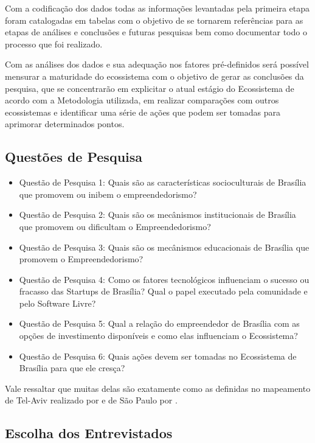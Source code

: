Com a codificação dos dados todas as informações levantadas pela primeira etapa foram catalogadas em tabelas com o objetivo de se tornarem referências para as etapas de análises e conclusões e futuras pesquisas bem como documentar todo o processo que foi realizado. 

Com as análises dos dados e sua adequação nos fatores pré-definidos será possível mensurar a maturidade do ecossistema com o objetivo de gerar as conclusões da pesquisa, que se concentrarão em explicitar o atual estágio do Ecossistema de acordo com a Metodologia utilizada, em realizar comparações com outros ecossistemas e identificar uma série de ações que podem ser tomadas para aprimorar determinados pontos.

\subsection{Questões de Pesquisa}
\label{subsection:questoes_de_pesquisa}

\begin{itemize}
  \item Questão de Pesquisa 1: Quais são as características socioculturais de Brasília que promovem ou inibem o empreendedorismo?
  \item Questão de Pesquisa 2: Quais são os mecânismos institucionais de Brasília que promovem ou dificultam o Empreendedorismo?
  \item Questão de Pesquisa 3: Quais são os mecânismos educacionais de Brasília que promovem o Empreendedorismo?
  \item Questão de Pesquisa 4: Como os fatores tecnológicos influenciam o sucesso ou fracasso das Startups de Brasília? Qual o papel executado pela comunidade e pelo Software Livre?
  \item Questão de Pesquisa 5: Qual a relação do empreendedor de Brasília com as opções de investimento disponíveis e como elas influenciam o Ecossistema?
  \item Questão de Pesquisa 6: Quais ações devem ser tomadas no Ecossistema de Brasília para que ele cresça?
\end{itemize}

Vale ressaltar que muitas delas são exatamente como as definidas no mapeamento de Tel-Aviv realizado por  e de São Paulo por .

\subsection{Escolha dos Entrevistados}
\label{subsection:escolha_dos_entrevistados}

